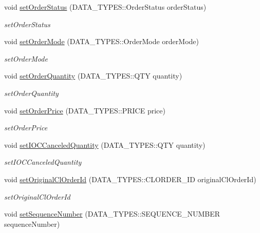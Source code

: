\begin{DoxyCompactItemize}
void \hyperlink{class_a_p_i2_1_1_order_confirmation_a731a3c8676e9ed9f13d36e3762669d43}{set\-Order\-Status} (D\-A\-T\-A\-\_\-\-T\-Y\-P\-E\-S\-::\-Order\-Status order\-Status)
\begin{DoxyCompactList}\small\item\em set\-Order\-Status \end{DoxyCompactList}\item 
void \hyperlink{class_a_p_i2_1_1_order_confirmation_aa99bfe0369031b37ffe971dd6f83360f}{set\-Order\-Mode} (D\-A\-T\-A\-\_\-\-T\-Y\-P\-E\-S\-::\-Order\-Mode order\-Mode)
\begin{DoxyCompactList}\small\item\em set\-Order\-Mode \end{DoxyCompactList}\item 
void \hyperlink{class_a_p_i2_1_1_order_confirmation_a790aff62038e36957f681f7bf1b01a18}{set\-Order\-Quantity} (D\-A\-T\-A\-\_\-\-T\-Y\-P\-E\-S\-::\-Q\-T\-Y quantity)
\begin{DoxyCompactList}\small\item\em set\-Order\-Quantity \end{DoxyCompactList}\item 
void \hyperlink{class_a_p_i2_1_1_order_confirmation_a4acf4ab9f114698fe9f3cf4adee7045c}{set\-Order\-Price} (D\-A\-T\-A\-\_\-\-T\-Y\-P\-E\-S\-::\-P\-R\-I\-C\-E price)
\begin{DoxyCompactList}\small\item\em set\-Order\-Price \end{DoxyCompactList}\item 
void \hyperlink{class_a_p_i2_1_1_order_confirmation_a4b758c54de6098c38aee7a49402bd38a}{set\-I\-O\-C\-Canceled\-Quantity} (D\-A\-T\-A\-\_\-\-T\-Y\-P\-E\-S\-::\-Q\-T\-Y quantity)
\begin{DoxyCompactList}\small\item\em set\-I\-O\-C\-Canceled\-Quantity \end{DoxyCompactList}\item 
void \hyperlink{class_a_p_i2_1_1_order_confirmation_aca1e77ca293afe948872e706ff7cccb9}{set\-Original\-Cl\-Order\-Id} (D\-A\-T\-A\-\_\-\-T\-Y\-P\-E\-S\-::\-C\-L\-O\-R\-D\-E\-R\-\_\-\-I\-D original\-Cl\-Order\-Id)
\begin{DoxyCompactList}\small\item\em set\-Original\-Cl\-Order\-Id \end{DoxyCompactList}\item 
void \hyperlink{class_a_p_i2_1_1_order_confirmation_a5ace7f295f651520dfc58d8ab4a74645}{set\-Sequence\-Number} (D\-A\-T\-A\-\_\-\-T\-Y\-P\-E\-S\-::\-S\-E\-Q\-U\-E\-N\-C\-E\-\_\-\-N\-U\-M\-B\-E\-R sequence\-Number)

\end{DoxyCompactItemize}
